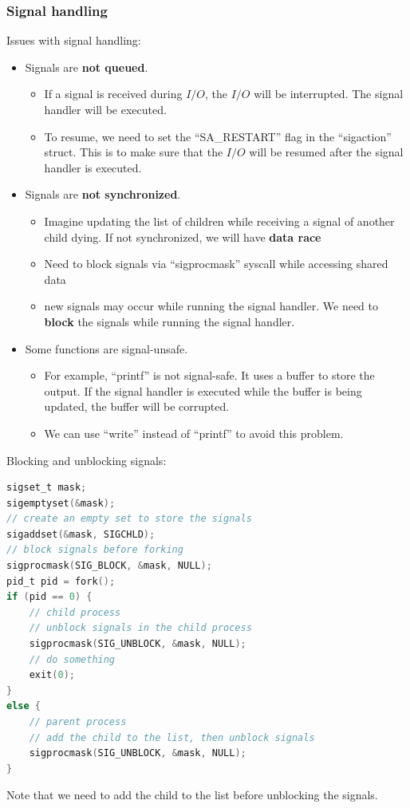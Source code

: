 \documentclass[letterpaper,12pt]{article}
\begin{document}
\subsubsection{Signal handling}
Issues with signal handling:\begin{itemize}
    \item Signals are \textbf{not queued}.
          \begin{itemize}

              \item If a signal is received during $I/O$, the $I/O$ will be interrupted. The signal
                    handler will be executed.
              \item To resume, we need to set the ``SA\_RESTART'' flag in the ``sigaction'' struct.
                    This is to make sure that the $I/O$ will be resumed after the signal handler is
                    executed.
          \end{itemize}

    \item Signals are \textbf{not synchronized}.
          \begin{itemize}

              \item Imagine updating the list of children while receiving a signal of another child
                    dying. If not synchronized, we will have \textbf{data race}
              \item Need to block signals via ``sigprocmask'' syscall while accessing shared data
              \item new signals may occur while running the signal handler. We need to
                    \textbf{block} the signals while running the signal handler.
          \end{itemize}
    \item Some functions are signal-unsafe.
          \begin{itemize}
                \item For example, ``printf'' is not signal-safe. It uses a buffer to store the
                      output. If the signal handler is executed while the buffer is being updated, the
                      buffer will be corrupted.
                \item We can use ``write'' instead of ``printf'' to avoid this problem.
          \end{itemize}
\end{itemize}

Blocking and unblocking signals:\begin{lstlisting}[language=C]
sigset_t mask;
sigemptyset(&mask);
// create an empty set to store the signals
sigaddset(&mask, SIGCHLD);
// block signals before forking
sigprocmask(SIG_BLOCK, &mask, NULL);
pid_t pid = fork();
if (pid == 0) {
    // child process
    // unblock signals in the child process
    sigprocmask(SIG_UNBLOCK, &mask, NULL);
    // do something
    exit(0);
}
else {
    // parent process
    // add the child to the list, then unblock signals
    sigprocmask(SIG_UNBLOCK, &mask, NULL);
}
\end{lstlisting}
Note that we need to add the child to the list before unblocking the signals. 
\end{document}
